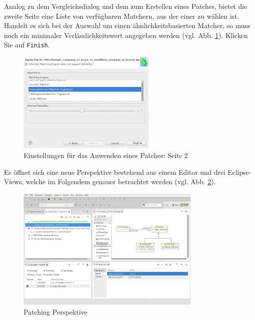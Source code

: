 Analog zu dem Vergleichsdialog und dem zum Erstellen eines Patches, bietet die zweite Seite eine Liste von verfügbaren Matchern, aus der einer zu wählen ist.
Handelt es sich bei der Auswahl um einen ähnlichkeitsbasierten Matcher, so muss noch ein minimaler Verlässlichkeitswert angegeben werden (vgl. Abb. \ref{silift-tutorial_patching_apply_config_page02}).
Klicken Sie auf \texttt{Finish}.

\begin{figure}[H]
\centering
\includegraphics[width=0.6\textwidth]{patching/graphics/silift-tutorial_patching_apply_config_page02.png}
\caption{Einstellungen für das Anwenden eines Patches: Seite 2}
\label{silift-tutorial_patching_apply_config_page02}
\end{figure}

Es öffnet sich eine neue Perspektive bestehend aus einem Editor und drei Eclipse-Views, welche im Folgendem genauer betrachtet werden (vgl. Abb. \ref{silift-tutorial_patching_perspective}).

\begin{figure}[H]
\centering
\includegraphics[width=0.8\textwidth]{patching/graphics/silift-tutorial_patching_perspective.png}
\caption{Patching Perspektive}
\label{silift-tutorial_patching_perspective}
\end{figure}

